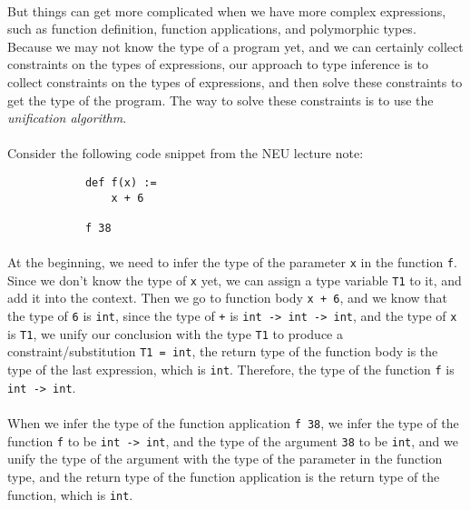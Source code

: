 \documentclass{article}
\begin{document}
    \paragraph{}
        But things can get more complicated when we have more complex expressions, such as function definition, function applications, and polymorphic types.
        Because we may not know the type of a program yet, and we can certainly collect constraints on the types of expressions,
        our approach to type inference is to collect constraints on the types of expressions, and then solve these constraints to get the type of the program.
        The way to solve these constraints is to use the \textit{unification algorithm}.

    \paragraph{}
        Consider the following code snippet from the NEU lecture note:
        \begin{verbatim}
            def f(x) := 
                x + 6

            f 38
        \end{verbatim}

    \paragraph{}
        At the beginning, we need to infer the type of the parameter \texttt{x} in the function \texttt{f}.
        Since we don't know the type of \texttt{x} yet, we can assign a type variable \texttt{T1} to it, and add it into the context.
        Then we go to function body \texttt{x + 6}, and we know that the type of \texttt{6} is \texttt{int}, since the type of \texttt{+} is \texttt{int -> int -> int},
        and the type of \texttt{x} is \texttt{T1}, we unify our conclusion with the type \texttt{T1} to produce a constraint/substitution \texttt{T1 = int}, the return type of the function body
        is the type of the last expression, which is \texttt{int}. Therefore, the type of the function \texttt{f} is \texttt{int -> int}.

    \paragraph{}
        When we infer the type of the function application \texttt{f 38}, we infer the type of the function \texttt{f} to be \texttt{int -> int}, and
        the type of the argument \texttt{38} to be \texttt{int}, and we unify the type of the argument with the type of the parameter in the function type,
        and the return type of the function application is the return type of the function, which is \texttt{int}.
\end{document}

